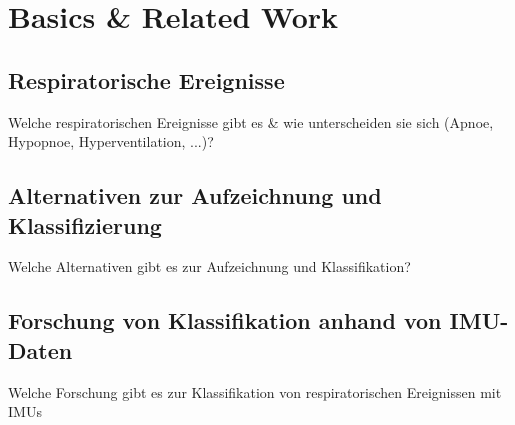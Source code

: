 
\chapter{Basics \& Related Work}
\label{ch:Basics}

\section{Respiratorische Ereignisse}
Welche respiratorischen Ereignisse gibt es \& wie unterscheiden sie sich (Apnoe, Hypopnoe, Hyperventilation, ...)?

\section{Alternativen zur Aufzeichnung und Klassifizierung}
Welche Alternativen gibt es zur Aufzeichnung und Klassifikation?

\section{Forschung von Klassifikation anhand von IMU-Daten}
Welche Forschung gibt es zur Klassifikation von respiratorischen Ereignissen mit IMUs